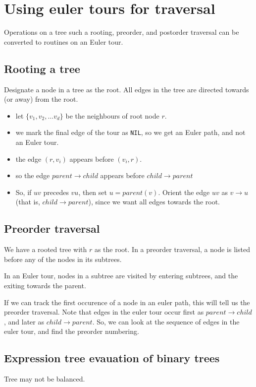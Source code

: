 \section{Using euler tours for traversal}
Operations on a tree such a rooting, preorder, and postorder traversal
can be converted to routines on an Euler tour.

\subsection{Rooting a tree}
Designate a node in a tree as the root. All edges in the tree are
directed towards (or away) from the root.

\begin{itemize}
\item let $\{v_1, v_2, \dots v_d\}$ be the neighbours of root node $r$. 
\item we mark the final edge of the tour as \texttt{NIL}, so we get an
Euler path, and not an Euler tour.
\item the edge $(r, v_i)$ appears before $(v_i, r)$.
\item so the edge $parent \to child$ appears before $child \to parent$
\item So, if $uv$ precedes $vu$, then set $u = parent(v)$. Orient the
edge $uv$ as $v \to u$ (that is, $child \to parent$), since we want all edges towards the root.
\end{itemize}

\subsection{Preorder traversal}
We have a rooted tree with $r$ as the root. In a preorder traversal, a node is
listed before any of the nodes in its subtrees.

In an Euler tour, nodes in a subtree are visited by entering subtrees,
and the exiting towards the parent.

If we can track the first occurence of a node in an euler path, this will
tell us the preorder traversal. Note that edges in the euler tour occur
first as $parent \to child$, and later as $child \to parent$. So, we can
look at the sequence of edges in the euler tour, and find the preorder
numbering.

\subsection{Expression tree evauation of binary trees}
Tree may not be balanced.

